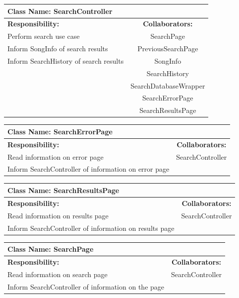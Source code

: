 \documentclass[]{article}
\begin{document}
	\begin{table}[a]
		\centering
		\begin{tabular}{| p{7cm} | c |} \hline
			\multicolumn{2}{|l|}{\textbf{Class Name: SearchController}} \\ \hline
			\textbf{Responsibility:} & \textbf{Collaborators:} \\ \hline
			Perform search use case & SearchPage \\ \hline
			Inform SongInfo of search results & PreviousSearchPage \\ \hline
			Inform SearchHistory of search results & SongInfo \\ \hline
			& SearchHistory \\ \hline
			& SearchDatabaseWrapper \\ \hline
			& SearchErrorPage \\ \hline
			& SearchResultsPage \\ \hline
		\end{tabular}
	\end{table}
	
	\begin{table}[a]
		\centering
		\begin{tabular}{| p{8cm} | c |} \hline
			\multicolumn{2}{|l|}{\textbf{Class Name: SearchErrorPage}} \\ \hline
			\textbf{Responsibility:} & \textbf{Collaborators:} \\ \hline
			Read information on error page & SearchController \\ \hline
			Inform SearchController of information on error page &   \\ \hline
		\end{tabular}
	\end{table}
	
	\begin{table}[a]
		\centering
		\begin{tabular}{| p{8cm} | c |} \hline
			\multicolumn{2}{|l|}{\textbf{Class Name: SearchResultsPage}} \\ \hline
			\textbf{Responsibility:} & \textbf{Collaborators:} \\ \hline
			Read information on results page & SearchController \\ \hline
			Inform SearchController of information on results page &   \\ \hline
		\end{tabular}
	\end{table}
	
	\begin{table}[a]
		\centering
		\begin{tabular}{| p{8cm} | c |} \hline
			\multicolumn{2}{|l|}{\textbf{Class Name: SearchPage}} \\ \hline
			\textbf{Responsibility:} & \textbf{Collaborators:} \\ \hline
			Read information on search page & SearchController \\ \hline
			Inform SearchController of information on the page &   \\ \hline
		\end{tabular}
	\end{table}
	
\end{document}
